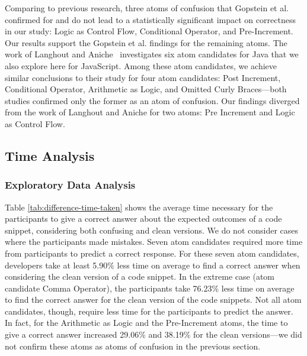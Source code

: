 Comparing to previous research, three 
atoms of confusion that Gopstein et al.~\cite{DBLP:conf/sigsoft/GopsteinIYDZYC17} confirmed
for \clang and \cpplang do not lead to a statistically significant impact
on correctness in our study: Logic as Control Flow,
Conditional Operator, and Pre-Increment. Our results
support the Gopstein et al. findings for the remaining
atoms. The work of Langhout and Aniche~\cite{Langhout:2021:ACJ} investigates six atom candidates for Java that we also explore here for JavaScript. Among these atom
candidates, we achieve similar conclusions to their
study for four atom candidates: Post Increment,
Conditional Operator, Arithmetic as Logic, and
Omitted Curly Braces---both studies confirmed only the former
as an atom of confusion. Our findings diverged from
the work of Langhout and Aniche for two atoms: Pre Increment and
Logic as Control Flow.


\subsection{Time Analysis}

\subsubsection*{Exploratory Data Analysis}
Table \ref{tab:difference-time-taken} shows the average time necessary for the participants to give a correct answer about the expected outcomes of a code snippet, considering both confusing and clean versions. We do not consider cases where the participants made mistakes. Seven atom candidates required more time from participants to predict a correct response. For these seven atom candidates, developers take at least 5.90\% less time on average to find a correct answer when considering the clean version of a code snippet. In the extreme case (atom candidate Comma Operator), the participants take 76.23\% less
time on average to find the correct answer for the clean version of the code snippets. 
Not all atom candidates, though, require less time for the participants to predict the answer. In fact, for the Arithmetic as Logic and the Pre-Increment atoms, the time to give a correct answer increased  
29.06\% and 38.19\% for the clean versions---we did not confirm these
atoms as atoms of confusion in the previous section.

